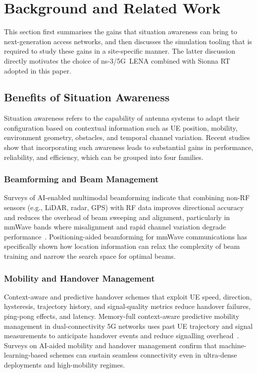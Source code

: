 \section{Background and Related Work}
\label{sec:literature}

This section first summarises the gains that situation awareness can bring to
next-generation access networks, and then discusses the simulation tooling
that is required to study these gains in a site-specific manner. The latter
discussion directly motivates the choice of ns-3/5G~LENA combined with Sionna
RT adopted in this paper.

\subsection{Benefits of Situation Awareness}

Situation awareness refers to the capability of antenna systems to adapt their
configuration based on contextual information such as UE position, mobility,
environment geometry, obstacles, and temporal channel variation. Recent
studies show that incorporating such awareness leads to substantial gains in
performance, reliability, and efficiency, which can be grouped into four
families.

\subsubsection{Beamforming and Beam Management}
Surveys of AI-enabled multimodal beamforming indicate that combining non-RF
sensors (e.g., LiDAR, radar, GPS) with RF data improves directional accuracy
and reduces the overhead of beam sweeping and alignment, particularly in
mmWave bands where misalignment and rapid channel variation degrade
performance~\cite{ref:multimodal_bf}. Positioning-aided beamforming for mmWave
communications has specifically shown how location information can relax the
complexity of beam training and narrow the search space for optimal beams.

\subsubsection{Mobility and Handover Management}
Context-aware and predictive handover schemes that exploit UE speed,
direction, hysteresis, trajectory history, and signal-quality metrics reduce
handover failures, ping-pong effects, and latency. Memory-full context-aware
predictive mobility management in dual-connectivity 5G networks uses past UE
trajectory and signal measurements to anticipate handover events and reduce
signalling overhead~\cite{ref:predictive_handover}. Surveys on AI-aided
mobility and handover management confirm that machine-learning-based schemes
can sustain seamless connectivity even in ultra-dense deployments and
high-mobility regimes.

